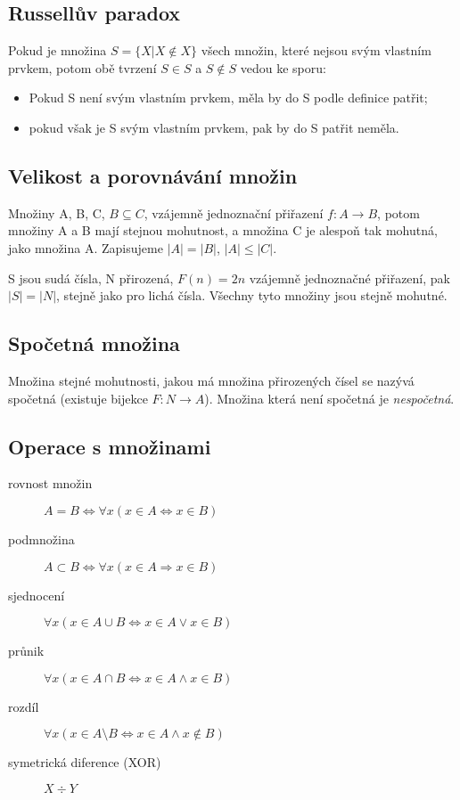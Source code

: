 \documentclass[a4paper, 11pt]{report}
\begin{document}
\subsection{Russellův paradox}

Pokud je množina $S = \{ X | X \notin X\}$ všech množin, které nejsou svým vlastním prvkem, potom obě tvrzení $ S \in S $ a $ S \notin S$ vedou ke sporu:
\begin{itemize}
	\item Pokud S není svým vlastním prvkem, měla by do S podle definice patřit;
	\item pokud však je S svým vlastním prvkem, pak by do S patřit neměla.
\end{itemize}

\subsection{Velikost a porovnávání množin}

Množiny A, B, C, $B \subseteq C $, vzájemně jednoznační přiřazení $f: A  \to B$, potom množiny A a B mají stejnou mohutnost, a množina C je alespoň tak mohutná, jako množina A. Zapisujeme $|A| = |B|$, $|A| \leq |C|$.

S jsou sudá čísla, N přirozená, $F(n) = 2n$ vzájemně jednoznačné přiřazení, pak $|S| = |N|$, stejně jako pro lichá čísla. Všechny tyto množiny jsou stejně mohutné.

\subsection{Spočetná množina}
Množina stejné mohutnosti, jakou má množina přirozených čísel se nazývá spočetná (existuje bijekce $F: N \to A$). Množina která není spočetná je \emph{nespočetná}.

\subsection{Operace s množinami}

\begin{description}
	\item[rovnost množin] $A = B \iff \forall x (x \in A \iff x \in B)$
	\item[podmnožina] $ A \subset B \iff \forall x (x \in A \Rightarrow x \in B)$
	\item[sjednocení] $ \forall x (x \in A \cup B \iff x \in A \lor x \in B)$
	\item[průnik] $ \forall x ( x \in A \cap B \iff x \in A \land x \in B)$
	\item[rozdíl] $ \forall x ( x \in A \setminus B \iff x \in A \land x \notin B)$
	\item[symetrická diference (XOR)] $X \div Y$ 
\end{description}
\end{document}
